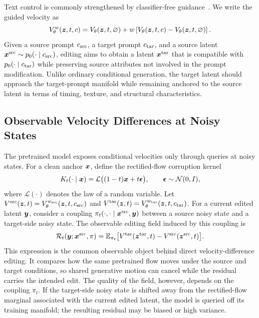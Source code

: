 Text control is commonly strengthened by classifier-free guidance~\cite{ho2022classifierfreediffusionguidance}.
We write the guided velocity as
\begin{equation}
    \label{eq:audio_cfg_velocity}
    V_\theta^{w}(\boldsymbol{z},t,c)
    =
    V_\theta(\boldsymbol{z},t,\varnothing)
    +
    w\left[
    V_\theta(\boldsymbol{z},t,c)-V_\theta(\boldsymbol{z},t,\varnothing)
    \right].
\end{equation}
Given a source prompt $c_{\mathrm{src}}$, a target prompt $c_{\mathrm{tar}}$, and a source latent $\boldsymbol{x}^{\mathrm{src}}\sim p_0(\cdot\mid c_{\mathrm{src}})$, editing aims to obtain a latent $\boldsymbol{x}^{\mathrm{tar}}$ that is compatible with $p_0(\cdot\mid c_{\mathrm{tar}})$ while preserving source attributes not involved in the prompt modification.
Unlike ordinary conditional generation, the target latent should approach the target-prompt manifold while remaining anchored to the source latent in terms of timing, texture, and structural characteristics.

\subsection{Observable Velocity Differences at Noisy States}
\label{sec:observable_velocity}

The pretrained model exposes conditional velocities only through queries at noisy states.
For a clean anchor $\boldsymbol{x}$, define the rectified-flow corruption kernel
\begin{equation}
    \label{eq:audio_kernel}
    K_t(\cdot\mid \boldsymbol{x})
    =
    \mathcal{L}\big((1-t)\boldsymbol{x}+t\boldsymbol{\epsilon}\big),
    \qquad \boldsymbol{\epsilon}\sim\mathcal{N}(0,I),
\end{equation}
where $\mathcal{L}(\cdot)$ denotes the law of a random variable.
Let $V^{\mathrm{src}}(\boldsymbol{z},t)=V_\theta^{w_{\mathrm{src}}}(\boldsymbol{z},t,c_{\mathrm{src}})$ and $V^{\mathrm{tar}}(\boldsymbol{z},t)=V_\theta^{w_{\mathrm{tar}}}(\boldsymbol{z},t,c_{\mathrm{tar}})$.
For a current edited latent $\boldsymbol{y}$, consider a coupling $\pi_t(\cdot,\cdot\mid \boldsymbol{x}^{\mathrm{src}},\boldsymbol{y})$ between a source noisy state and a target-side noisy state.
The observable editing field induced by this coupling is
\begin{equation}
    \label{eq:observable_residual}
    \begin{aligned}
    \mathcal{R}_t(\boldsymbol{y};\boldsymbol{x}^{\mathrm{src}},\pi)
    =
    \mathbb{E}_{\pi_t}\big[
    V^{\mathrm{tar}}(\boldsymbol{z}^{\mathrm{tar}},t)
    -
    V^{\mathrm{src}}(\boldsymbol{z}^{\mathrm{src}},t)
    \big].
    \end{aligned}
\end{equation}
This expression is the common observable object behind direct velocity-difference editing.
It compares how the same pretrained flow moves under the source and target conditions, so shared generative motion can cancel while the residual carries the intended edit.
The quality of the field, however, depends on the coupling $\pi_t$.
If the target-side noisy state is shifted away from the rectified-flow marginal associated with the current edited latent, the model is queried off its training manifold; the resulting residual may be biased or high variance.

